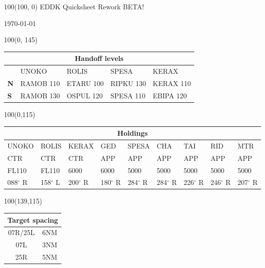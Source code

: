\documentclass[10pt,landscape,a4paper]{article}
\begin{document}
\begin{textblock}{100}(100, 0)
  \large
  \centering
  EDDK Quicksheet Rework BETA!

  \today
\end{textblock}

\begin{textblock}{100}(0, 145)
\begin{table}[]
\begin{tabular}{|l|l|l|l|l|}
\multicolumn{5}{c}{\textbf{Handoff levels}}              \\ \hline
           & UNOKO     & ROLIS     & SPESA     & KERAX     \\ \hline
\textbf{N} & RAMOB 110 & ETARU 100 & RIPKU 130 & KERAX 110 \\
\textbf{S} & RAMOB 130 & OSPUL 120 & SPESA 110 & EBIPA 120 \\ \hline
\end{tabular}
\end{table}
\end{textblock}

\begin{textblock}{100}(0,115)
\begin{table}[]
\begin{tabular}{|l|l|l|l|l|l|l|l|l|}

\multicolumn{9}{c}{\textbf{Holdings}}                                        \\ \hline
UNOKO  & ROLIS  & KERAX  & GED    & SPESA  & CHA    & TAI    & RID    & MTR    \\ \hline
CTR    & CTR    & CTR    & APP    & APP    & APP    & APP    & APP    & APP    \\
FL110  & FL110  & 6000   & 6000   & 5000   & 5000   & 5000   & 5000   & 5000   \\
088$^\circ$ R & 158$^\circ$ L & 200$^\circ$ R & 180$^\circ$ R & 284$^\circ$ R & 284$^\circ$ R & 226$^\circ$ R & 246$^\circ$ R & 207$^\circ$ R \\ \hline
\end{tabular}
\end{table}
\end{textblock}

\begin{textblock}{100}(139,115)
\begin{table}[]
\begin{tabular}{|c|l|}
\multicolumn{2}{c}{\textbf{Target spacing}} \\ \hline
07R/25L  & 6NM  \\ \hline
07L      & 3NM  \\ \hline
25R      & 5NM  \\ \hline
\end{tabular}
\end{table}
\end{textblock}
\end{document}
